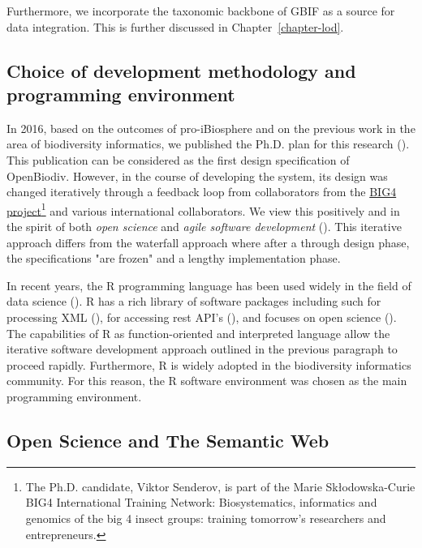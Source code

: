 Furthermore, we incorporate the taxonomic backbone of GBIF \cite{gbif_secretariat_gbif_2017} as a source for data integration. This is further discussed in Chapter~\ref{chapter-lod}.

\subsection*{Choice of development methodology and programming environment}

In 2016, based on the outcomes of pro-iBiosphere and on the previous work in the area of biodiversity informatics, we published the Ph.D. plan for this research (\cite{senderov_open_2016}). This publication can be considered as the first design specification of OpenBiodiv. However, in the course of developing the system, its design was changed iteratively through a feedback loop from collaborators from the \href{http://big4-project.eu}{BIG4 project}\footnote{The Ph.D. candidate, Viktor Senderov, is part of the Marie Skłodowska-Curie BIG4 International Training Network: Biosystematics, informatics and genomics of the big 4 insect groups: training tomorrow's researchers and entrepreneurs.} and various international collaborators. We view this positively and in the spirit of both \emph{open science} and \emph{agile software development} (\cite{beck_manifesto_2001}). This iterative approach differs from the waterfall approach where after a through design phase, the specifications "are frozen" and a lengthy implementation phase.

In recent years, the R programming language has been used widely in the field of data science (\cite{r_core_team_r:_2016}). R has a rich library of software packages including such for processing XML (\cite{wickham_xml2:_2018}), for accessing rest API's (\cite{wickham_httr:_2017}), and focuses on open science (\cite{boettiger_building_2015}). The capabilities of R as function-oriented and interpreted language allow the iterative software development approach outlined in the previous paragraph to proceed rapidly. Furthermore, R is widely adopted in the biodiversity informatics community. For this reason, the R software environment was chosen as the main programming environment.

\subsection*{Open Science and The Semantic Web}

